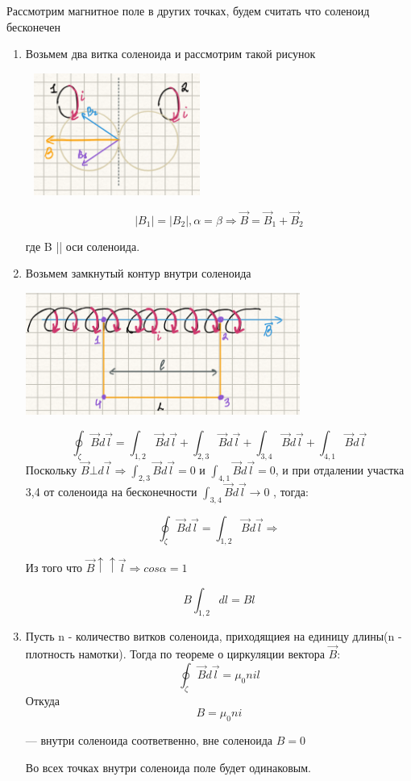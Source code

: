 \documentclass[../main.tex]{subfiles}
\begin{document}
Рассмотрим магнитное поле в других точках, будем считать что соленоид бесконечен
\begin{enumerate}
    \item Возьмем два витка соленоида и рассмотрим такой рисунок
    \begin{center}
        \includegraphics[width=6cm, height=4cm]{../img/soly_1.png}
    \end{center}
    \[|B_1| = |B_2| , \alpha = \beta \Rightarrow \vec B = \vec B_1 + \vec B_2\]
    \begin{center}
        где B || оси соленоида.
    \end{center}

    \item Возьмем замкнутый контур внутри соленоида 
    \begin{center}  
        \includegraphics[width=9cm, height=4cm]{../img/soly_2.png}
    \end{center}
    \[ \oint_{\zeta} \vec B d \vec l = \int_{1,2} \vec B d \vec l + \int_{2,3} \vec B d \vec l + \int_{3,4} \vec B d \vec l + \int_{4,1} \vec B d \vec l\]
    Поскольку $\vec B \bot d \vec l \Rightarrow \int_{2,3} \vec B d \vec l = 0$ и $\int_{4,1} \vec B d \vec l = 0$,
    и при отдалении участка 3,4 от соленоида на бесконечности $\int_{3,4} \vec B d \vec l \to 0$ ,
    тогда:
    
    \[\oint_{\zeta} \vec B d \vec l = \int_{1,2} \vec B d \vec l \Rightarrow\]
    \begin{center}
        Из того что $\vec B \uparrow \uparrow \vec l \Rightarrow cos{\alpha} = 1$
    \end{center}
    \[B\int_{1,2} dl = Bl\]

    \item Пусть n - количество витков соленоида, приходящиея на единицу длины(n - плотность намотки). Тогда по теореме о циркуляции вектора $\vec B$:
    \[\oint_{\zeta} \vec B d \vec l = \mu_0 n i l\]
    Откуда 
    \[B = \mu_0 n i\]
    \begin{center}
        --- внутри соленоида соответвенно, вне соленоида $B = 0$
    \end{center}
    Во всех точках внутри соленоида поле будет одинаковым.
\end{enumerate}
\end{document}
